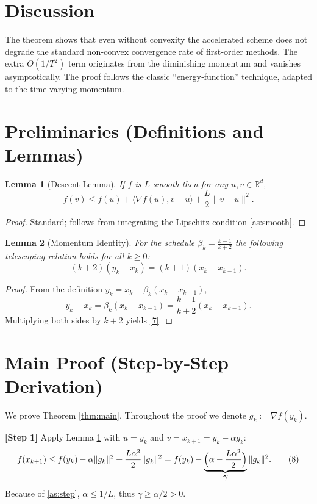 \documentclass[11pt]{article}
\newtheorem{lemma}{Lemma}
\newcommand{\R}{\mathbb{R}}
\begin{document}
\section*{Discussion}
The theorem shows that even without convexity the accelerated scheme does not degrade the standard non‑convex convergence rate of first‑order methods. The extra $O(1/T^{2})$ term originates from the diminishing momentum and vanishes asymptotically. The proof follows the classic “energy‑function” technique, adapted to the time‑varying momentum.

\section*{Preliminaries (Definitions and Lemmas)}
\begin{lemma}[Descent Lemma]\label{lem:descent}
If $f$ is $L$‑smooth then for any $u,v\in\R^d$,
\[
f(v)\le f(u)+\langle\nabla f(u),v-u\rangle+\frac{L}{2}\|v-u\|^{2}.
\tag{6}
\]
\end{lemma}
\begin{proof}
Standard; follows from integrating the Lipschitz condition \eqref{as:smooth}. \qedhere
\end{proof}

\begin{lemma}[Momentum Identity]\label{lem:momentum}
For the schedule $\beta_k=\frac{k-1}{k+2}$ the following telescoping relation holds for all $k\ge0$:
\[
(k+2)(y_k-x_k)=(k+1)(x_k-x_{k-1}).
\tag{7}
\]
\end{lemma}
\begin{proof}
From the definition $y_k=x_k+\beta_k(x_k-x_{k-1})$,
\[
y_k-x_k=\beta_k(x_k-x_{k-1})=\frac{k-1}{k+2}(x_k-x_{k-1}).
\]
Multiplying both sides by $k+2$ yields \eqref{7}. \qedhere
\end{proof}

\section*{Main Proof (Step‑by‑Step Derivation)}
We prove Theorem \ref{thm:main}. Throughout the proof we denote $g_k:=\nabla f(y_k)$.

\bigskip
\noindent\textbf{[Step 1]}  Apply Lemma \ref{lem:descent} with $u=y_k$ and $v=x_{k+1}=y_k-\alpha g_k$:
\[
f(x_{k+1})\le f(y_k)-\alpha\|g_k\|^{2}+\frac{L\alpha^{2}}{2}\|g_k\|^{2}
= f(y_k)-\underbrace{\Bigl(\alpha-\frac{L\alpha^{2}}{2}\Bigr)}_{\displaystyle \gamma}\|g_k\|^{2}.
\tag{8}
\]
Because of \eqref{as:step}, $\alpha\le 1/L$, thus $\gamma\ge \alpha/2>0$.
\end{document}
